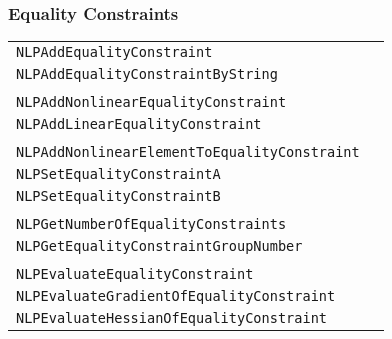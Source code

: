 \documentclass[12pt]{article}
\begin{document}
\subsubsection{Equality Constraints}
\begin{center}
\begin{tabular}{ll}
\tt NLPAddEqualityConstraint&\pageref{Subroutine:NLPAddEqualityConstraint}\\
\tt NLPAddEqualityConstraintByString&\pageref{Subroutine:NLPAddEqualityConstraintByString}\\
\\
\tt NLPAddNonlinearEqualityConstraint&\pageref{Subroutine:NLPAddNonlinearEqualityConstraint}\\
\tt NLPAddLinearEqualityConstraint&\pageref{Subroutine:NLPAddLinearEqualityConstraint}\\
\\
\tt NLPAddNonlinearElementToEqualityConstraint&\pageref{Subroutine:NLPAddNonlinearElementToEqualityConstraint}\\
\tt NLPSetEqualityConstraintA&\pageref{Subroutine:NLPSetEqualityConstraintA}\\
\tt NLPSetEqualityConstraintB&\pageref{Subroutine:NLPSetEqualityConstraintB}\\
\\
\tt NLPGetNumberOfEqualityConstraints&\pageref{Subroutine:NLPGetNumberOfEqualityConstraints}\\
\tt NLPGetEqualityConstraintGroupNumber&\pageref{Subroutine:NLPGetEqualityConstraintGroupNumber}\\
\\
\tt NLPEvaluateEqualityConstraint&\pageref{Subroutine:NLPEvaluateEqualityConstraint}\\
\tt NLPEvaluateGradientOfEqualityConstraint&\pageref{Subroutine:NLPEvaluateGradientOfEqualityConstraint}\\
\tt NLPEvaluateHessianOfEqualityConstraint&\pageref{Subroutine:NLPEvaluateHessianOfEqualityConstraint}\\
\end{tabular}
\end{center}
\end{document}
